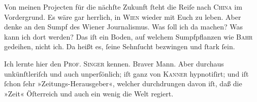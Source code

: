 \pstart
           Von meinen Projecten für die nächſte Zukunft{ }ſteht die Reiſe nach \textsc{China} im Vordergrund. Es wäre gar herrlich, in \textsc{Wien} wieder mit Euch zu leben. Aber denke an den Sumpf des Wiener Journalismus. {\pb}Was{ }ſoll
               ich da machen? Was kann ich dort werden? Das iſt ein Boden, auf welchem Sumpfpflanzen
               wie \textsc{Bahr} gedeihen, nicht ich. Da heißt es,{ }ſeine Sehnſucht bezwingen und{ }ſtark{ }ſein.\pend
           
\pstart
           Ich lernte hier den \textsc{Prof. Singer} kennen. Braver Mann. Aber durchaus unkünſtleriſch und auch unperſönlich; iſt
               ganz von \textsc{Kanner} hypnotiſirt; und iſt{ }ſchon{ }ſehr »Zeitungs-Herausgeber«, welcher durchdrungen davon iſt, daß
               die »Zeit« Öſterreich und auch ein wenig die Welt regiert.\pend
           

